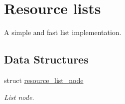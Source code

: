 \hypertarget{group__rlists}{}\section{Resource lists}
\label{group__rlists}


A simple and fast list implementation.  


\subsection*{Data Structures}
\begin{DoxyCompactItemize}
\item 
struct \hyperlink{structresource__list__node}{resource\+\_\+list\+\_\+node}
\begin{DoxyCompactList}\small\item\em List node. \end{DoxyCompactList}\end{DoxyCompactItemize}
